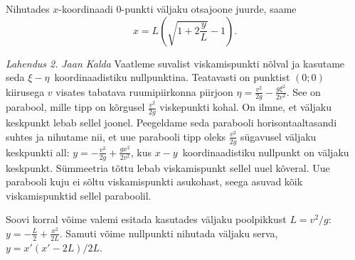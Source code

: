 Nihutades $x$-koordinaadi $0$-punkti väljaku otsajoone juurde, saame
\[x=L\left(\sqrt{1+2\frac{y}{L}}-1\right).\]

\emph{Lahendus 2.}
\emph{Jaan Kalda}
Vaatleme suvalist viskamispunkti nõlval ja kasutame seda $\xi-\eta$~koordinaadistiku nullpunktina. Teatavasti on punktist $(0;0)$ kiirusega $v$ visates tabatava ruumipiirkonna piirjoon $\eta=\frac{v^2}{2g}-\frac{g\xi^2}{2v^2}$. See on parabool, mille tipp on kõrgusel $\frac{v^2}{2g}$ viskepunkti kohal. On ilmne, et väljaku keskpunkt lebab sellel joonel. Peegeldame seda parabooli horisontaaltasandi suhtes ja nihutame nii, et uue parabooli tipp oleks $\frac{v^2}{2g}$ sügavusel väljaku keskpunkti all: $y=-\frac{v^2}{2g}+\frac{gx^2}{2v^2}$, kus  $x-y$~koordinaadistiku nullpunkt on väljaku keskpunkt. Sümmeetria tõttu lebab viskamispunkt sellel uuel kõveral. Uue parabooli kuju ei sõltu viskamispunkti asukohast, seega asuvad kõik viskamispunktid sellel paraboolil.

Soovi korral võime valemi esitada kasutades väljaku poolpikkust $L=v^2/g$: $y=-\frac L2+\frac{x^2}{2L}$. Samuti võime nullpunkti nihutada väljaku serva, $y=x'(x'-2L)/2L$.
\probend